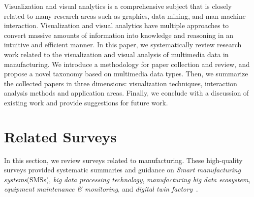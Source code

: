 \documentclass[a4paper,fleqn]{cas-dc}
\begin{document}
Visualization and visual analytics is a comprehensive subject that is closely related to many research areas such as graphics, data mining, and man-machine interaction.
Visualization and visual analytics have multiple approaches to convert massive amounts of information into knowledge and reasoning in an intuitive and efficient manner.
In this paper, we systematically review research work related to the visualization and visual analysis of multimedia data in manufacturing.
We introduce a methodology for paper collection and review, and propose a novel taxonomy based on multimedia data types.
Then, we summarize the collected papers in three dimensions: visualization techniques, interaction analysis methods and application areas.
Finally, we conclude with a discussion of existing work and provide suggestions for future work.

\section{Related Surveys}
In this section, we review surveys related to manufacturing.
These high-quality surveys provided systematic summaries and guidance on \textit{Smart manufacturing systems}(SMSs), \textit{big data processing technology}, \textit{manufacturing big data ecosystem}, \textit{equipment maintenance \& monitoring}, and \textit{digital twin factory}~\cite{Baboli2021,Chhikara2022,Cui2020,Park2020,Qu2019}.
\end{document}
